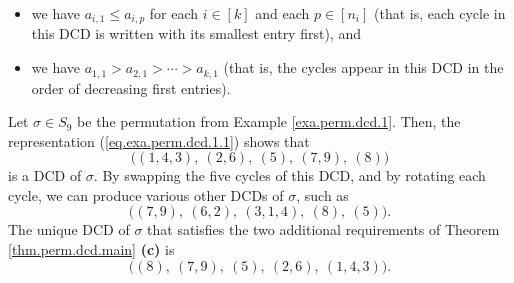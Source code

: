 \begin{theorem}
\begin{itemize}
\item we have $a_{i,1}\leq a_{i,p}$ for each $i\in\left[  k\right]  $ and each
$p\in\left[  n_{i}\right]  $ (that is, each cycle in this DCD is written with
its smallest entry first), and

\item we have $a_{1,1}>a_{2,1}>\cdots>a_{k,1}$ (that is, the cycles appear in
this DCD in the order of decreasing first entries).
\end{itemize}
\end{theorem}

\begin{example}
Let $\sigma\in S_{9}$ be the permutation from Example \ref{exa.perm.dcd.1}.
Then, the representation (\ref{eq.exa.perm.dcd.1.1}) shows that%
\[
\Big(\left(  1,4,3\right)  ,\ \left(  2,6\right)  ,\ \left(  5\right)
,\ \left(  7,9\right)  ,\ \left(  8\right)  \Big)
\]
is a DCD of $\sigma$. By swapping the five cycles of this DCD, and by rotating
each cycle, we can produce various other DCDs of $\sigma$, such as
\[
\Big(\left(  7,9\right)  ,\ \left(  6,2\right)  ,\ \left(  3,1,4\right)
,\ \left(  8\right)  ,\ \left(  5\right)  \Big).
\]
The unique DCD of $\sigma$ that satisfies the two additional requirements of
Theorem \ref{thm.perm.dcd.main} \textbf{(c)} is
\[
\Big(\left(  8\right)  ,\ \left(  7,9\right)  ,\ \left(  5\right)  ,\ \left(
2,6\right)  ,\ \left(  1,4,3\right)  \Big).
\]

\end{example}

